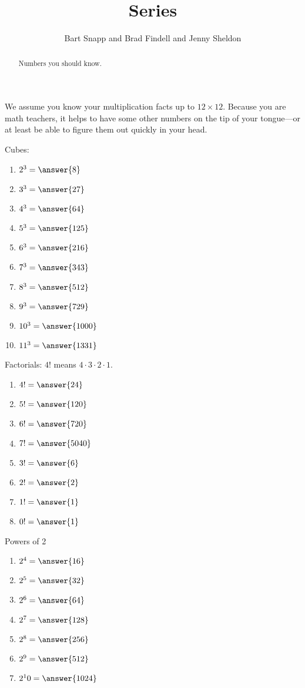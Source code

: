 \documentclass[nooutcomes]{ximera}
\title{Series}
\author{Bart Snapp and Brad Findell and Jenny Sheldon}
\begin{document}
\begin{abstract}
Numbers you should know. 
\end{abstract}
\maketitle




We assume you know your multiplication facts up to $12\times 12$. Because you are math teachers, it helps to have some other numbers on the tip of your tongue---or at least be able to figure them out quickly in your head. 


Cubes:
\begin{enumerate}
\item $2^3 = \answer{8}$
\item $3^3 = \answer{27}$
\item $4^3 = \answer{64}$
\item $5^3 = \answer{125}$
\item $6^3 = \answer{216}$
\item $7^3 = \answer{343}$
\item $8^3 = \answer{512}$
\item $9^3 = \answer{729}$
\item $10^3 = \answer{1000}$
\item $11^3 = \answer{1331}$
\end{enumerate}

Factorials: $4!$ means $4\cdot3\cdot2\cdot1$.  
\begin{enumerate}
\item $4!= \answer{24}$
\item $5!= \answer{120}$
\item $6!= \answer{720}$
\item $7!= \answer{5040}$
\item $3!= \answer{6}$
\item $2!= \answer{2}$
\item $1!= \answer{1}$
\item $0!= \answer{1}$
\end{enumerate}

Powers of 2
\begin{enumerate}
\item $2^4 = \answer{16}$
\item $2^5 = \answer{32}$
\item $2^6 = \answer{64}$
\item $2^7 = \answer{128}$
\item $2^8 = \answer{256}$
\item $2^9 = \answer{512}$
\item $2^10 = \answer{1024}$
\end{enumerate}
\end{document}

